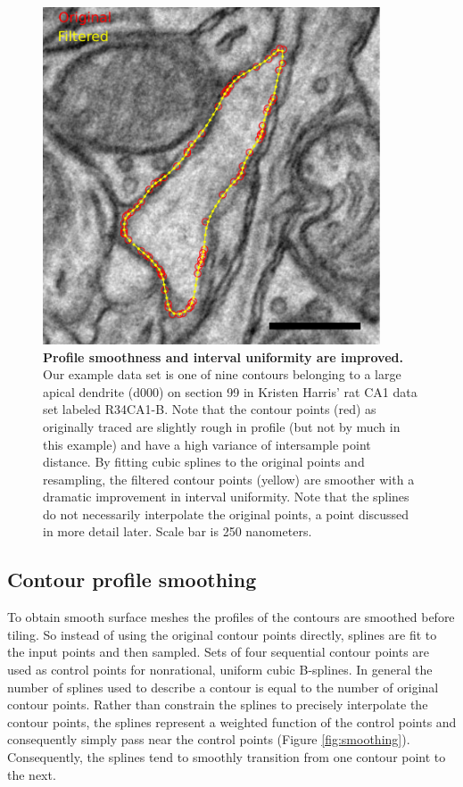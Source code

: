 \documentclass[12pt]{article}
\begin{document}
\begin{figure}[htb]
  \begin{center}
    \includegraphics[width=10cm]{figures/raw_and_sample_overlay_em.pdf}
    \caption{\textbf{Profile smoothness and interval uniformity are
    improved.} Our example data set is one of nine contours belonging
    to a large apical dendrite (d000) on section 99 in Kristen Harris'
    rat CA1 data set labeled R34CA1-B. Note that the contour points
    (red) as originally traced are slightly rough in profile (but not
    by much in this example) and have a high variance of intersample
    point distance. By fitting cubic splines to the original points
    and resampling, the filtered contour points (yellow) are smoother
    with a dramatic improvement in interval uniformity. Note that
    the splines do not necessarily interpolate the original points, a
    point discussed in more detail later. Scale bar is 250 nanometers.}
    \label{fig:raw_and_sample_overlay_em}
  \end{center}
\end{figure}

\subsection{Contour profile smoothing}

To obtain smooth surface meshes the profiles of the contours are 
smoothed before tiling. So instead of using the original contour
points directly, splines are fit to the input points and then sampled.
Sets of four sequential contour points are used as control points for
nonrational, uniform cubic B-splines. In general the number of splines
used to describe a contour is equal to the number of original contour
points. Rather than constrain the splines to precisely interpolate
the contour points, the splines represent a weighted function of the
control points and consequently simply pass near the control points
(Figure \ref{fig:smoothing}). Consequently, the splines tend to smoothly
transition from one contour point to the next.
\end{document}
